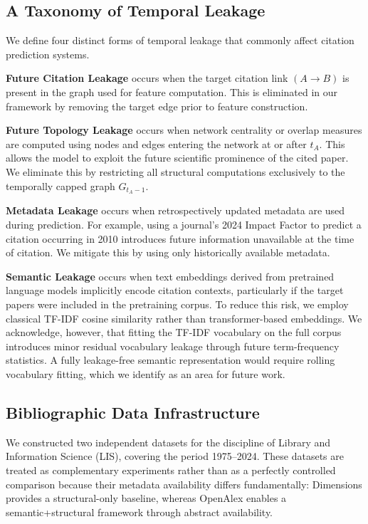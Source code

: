 \documentclass[11pt,a4paper]{article}
\begin{document}
\subsection{A Taxonomy of Temporal Leakage}

We define four distinct forms of temporal leakage that commonly affect citation prediction systems.

\textbf{Future Citation Leakage} occurs when the target citation link \((A \to B)\) is present in the graph used for feature computation. This is eliminated in our framework by removing the target edge prior to feature construction.

\textbf{Future Topology Leakage} occurs when network centrality or overlap measures are computed using nodes and edges entering the network at or after \(t_A\). This allows the model to exploit the future scientific prominence of the cited paper. We eliminate this by restricting all structural computations exclusively to the temporally capped graph \(G_{t_A-1}\).

\textbf{Metadata Leakage} occurs when retrospectively updated metadata are used during prediction. For example, using a journal's 2024 Impact Factor to predict a citation occurring in 2010 introduces future information unavailable at the time of citation. We mitigate this by using only historically available metadata.

\textbf{Semantic Leakage} occurs when text embeddings derived from pretrained language models implicitly encode citation contexts, particularly if the target papers were included in the pretraining corpus. To reduce this risk, we employ classical TF-IDF cosine similarity rather than transformer-based embeddings. We acknowledge, however, that fitting the TF-IDF vocabulary on the full corpus introduces minor residual vocabulary leakage through future term-frequency statistics. A fully leakage-free semantic representation would require rolling vocabulary fitting, which we identify as an area for future work.

\subsection{Bibliographic Data Infrastructure}

We constructed two independent datasets for the discipline of Library and Information Science (LIS), covering the period 1975--2024. These datasets are treated as complementary experiments rather than as a perfectly controlled comparison because their metadata availability differs fundamentally: Dimensions provides a structural-only baseline, whereas OpenAlex enables a semantic+structural framework through abstract availability.
\end{document}

